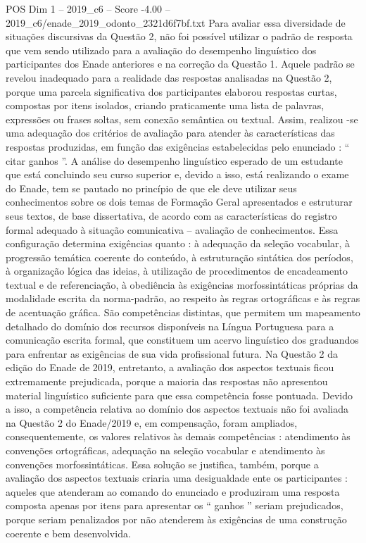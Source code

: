 \begin{textsample}{POS Dim 1 – 2019\_c6 – Score -4.00 – 2019\_c6/enade\_2019\_odonto\_2321d6f7bf.txt}
Para avaliar essa diversidade de situações discursivas da Questão 2, não foi possível utilizar o padrão de resposta que vem sendo utilizado para a avaliação do desempenho linguístico dos participantes dos Enade anteriores e na correção da Questão 1.
Aquele padrão se revelou inadequado para a realidade das respostas analisadas na Questão 2, porque uma parcela significativa dos participantes elaborou respostas curtas, compostas por itens isolados, criando praticamente uma lista de palavras, expressões ou frases soltas, sem conexão semântica ou textual.
Assim, realizou -se uma adequação dos critérios de avaliação para atender às características das respostas produzidas, em função das exigências estabelecidas pelo enunciado : “ citar ganhos ”.
A análise do desempenho linguístico esperado de um estudante que está concluindo seu curso superior e, devido a isso, está realizando o exame do Enade, tem se pautado no princípio de que ele deve utilizar seus conhecimentos sobre os dois temas de Formação Geral apresentados e estruturar seus textos, de base dissertativa, de acordo com as características do registro formal adequado à situação comunicativa – avaliação de conhecimentos.
Essa configuração determina exigências quanto : à adequação da seleção vocabular, à progressão temática coerente do conteúdo, à estruturação sintática dos períodos, à organização lógica das ideias, à utilização de procedimentos de encadeamento textual e de referenciação, à obediência às exigências morfossintáticas próprias da modalidade escrita da norma-padrão, ao respeito às regras ortográficas e às regras de acentuação gráfica.
São competências distintas, que permitem um mapeamento detalhado do domínio dos recursos disponíveis na Língua Portuguesa para a comunicação escrita formal, que constituem um acervo linguístico dos graduandos para enfrentar as exigências de sua vida profissional futura.
Na Questão 2 da edição do Enade de 2019, entretanto, a avaliação dos aspectos textuais ficou extremamente prejudicada, porque a maioria das respostas não apresentou material linguístico suficiente para que essa competência fosse pontuada.
Devido a isso, a competência relativa ao domínio dos aspectos textuais não foi avaliada na Questão 2 do Enade/2019 e, em compensação, foram ampliados, consequentemente, os valores relativos às demais competências : atendimento às convenções ortográficas, adequação na seleção vocabular e atendimento às convenções morfossintáticas.
Essa solução se justifica, também, porque a avaliação dos aspectos textuais criaria uma desigualdade ente os participantes : aqueles que atenderam ao comando do enunciado e produziram uma resposta composta apenas por itens para apresentar os “ ganhos ” seriam prejudicados, porque seriam penalizados por não atenderem às exigências de uma construção coerente e bem desenvolvida.

\end{textsample}
